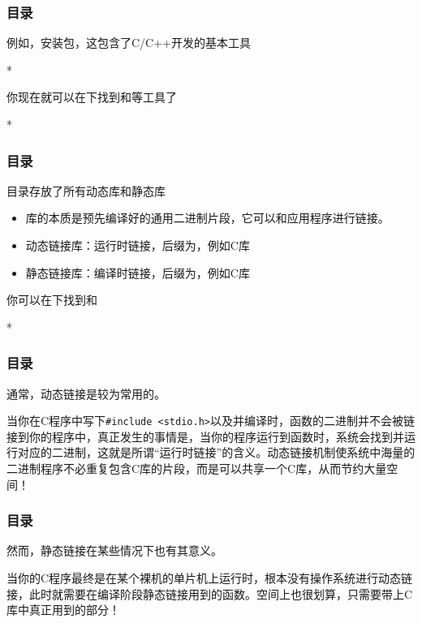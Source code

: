 \begin{frame}
    \frametitle{目录}
    例如，安装包，这包含了C/C++开发的基本工具
    \begin{Code}*
        
    \end{Code}
    你现在就可以在下找到和等工具了
    \begin{Code}*
        
    \end{Code}
\end{frame}

\begin{frame}
    \frametitle{目录}
    目录存放了所有动态库和静态库 
    \begin{itemize}
        \item 库的本质是预先编译好的通用二进制片段，它可以和应用程序进行链接。
        \item 动态链接库：运行时链接，后缀为，例如C库
        \item 静态链接库：编译时链接，后缀为，例如C库
    \end{itemize}
    你可以在下找到和
    \begin{Code}*
        
    \end{Code}
\end{frame}

\begin{frame}
    \frametitle{目录}
    通常，动态链接是较为常用的。
    
    当你在C程序中写下\texttt{\#include <stdio.h>}以及并编译时，函数的二进制并不会被链接到你的程序中，真正发生的事情是，当你的程序运行到函数时，系统会找到并运行对应的二进制，这就是所谓“运行时链接”的含义。动态链接机制使系统中海量的二进制程序不必重复包含C库的片段，而是可以共享一个C库，从而节约大量空间！

\end{frame}

\begin{frame}
    \frametitle{目录}
    
    然而，静态链接在某些情况下也有其意义。
    
    当你的C程序最终是在某个裸机的单片机上运行时，根本没有操作系统进行动态链接，此时就需要在编译阶段静态链接用到的函数。空间上也很划算，只需要带上C库中真正用到的部分！
\end{frame}


